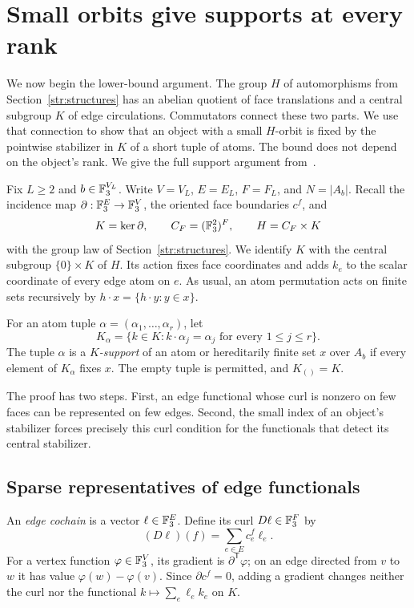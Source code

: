 \section{Small orbits give supports at every rank}\label{sec:support}\label{sup:support}

We now begin the lower-bound argument. The group $H$ of automorphisms from
Section~\ref{str:structures} has an abelian quotient of face translations
and a central subgroup $K$ of edge circulations. Commutators connect these
two parts. We use that connection to show that an object with a small
$H$-orbit is fixed by the pointwise stabilizer in $K$ of a short tuple of
atoms. The bound does not depend on the object's rank. We give the full
support argument from~\cite[Section~3, Proposition~8]{cptCompanion2026}.

Fix $L\ge2$ and $b\in\mathbb F_3^{V_L}$. Write $V=V_L$, $E=E_L$, $F=F_L$,
and $N=|A_b|$. Recall the incidence map
$\partial:\mathbb F_3^E\to\mathbb F_3^V$, the oriented face boundaries $c^f$, and
\[
 K=\ker\partial,\qquad C_F=(\mathbb F_3^2)^F,
 \qquad H=C_F\times K
\]
with the group law of Section~\ref{str:structures}. We identify $K$ with
the central subgroup $\{0\}\times K$ of $H$. Its action fixes face
coordinates and adds $k_e$ to the scalar coordinate of every edge atom
on $e$. As usual, an atom permutation acts on finite sets recursively by
$h\cdot x=\{h\cdot y:y\in x\}$.

\begin{definition}\label{sup:definition}
For an atom tuple $\alpha=(\alpha_1,\ldots,\alpha_r)$, let
\[
 K_\alpha=\{k\in K:k\cdot\alpha_j=\alpha_j
                         \text{ for every }1\le j\le r\}.
\]
The tuple $\alpha$ is a \emph{$K$-support} of an atom or hereditarily
finite set $x$ over $A_b$ if every element of $K_\alpha$ fixes $x$.
The empty tuple is permitted, and $K_{()}=K$.
\end{definition}

The proof has two steps. First, an edge functional whose curl is nonzero
on few faces can be represented on few edges. Second, the small index of
an object's stabilizer forces precisely this curl condition for the
functionals that detect its central stabilizer.

\subsection{Sparse representatives of edge functionals}

An \emph{edge cochain} is a vector $\ell\in\mathbb F_3^E$. Define its curl
$D\ell\in\mathbb F_3^F$ by
\[
 (D\ell)(f)=\sum_{e\in E}c^f_e\ell_e.
\]
For a vertex function $\varphi\in\mathbb F_3^V$, its gradient is
$\partial^{\mathsf T}\varphi$; on an edge directed from $v$ to $w$ it
has value $\varphi(w)-\varphi(v)$. Since $\partial c^f=0$, adding a
gradient changes neither the curl nor the functional
$k\mapsto\sum_e\ell_e k_e$ on $K$.

